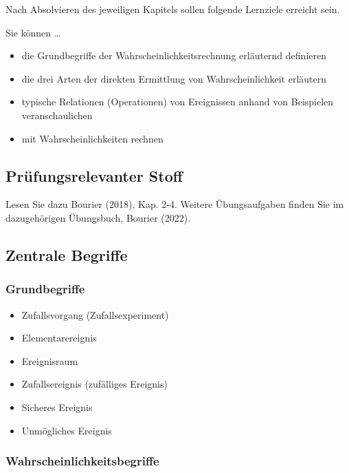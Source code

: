\documentclass[
  a4paper,
  DIV=11]{scrreprt}
\providecommand{\tightlist}{%
  \setlength{\itemsep}{0pt}\setlength{\parskip}{0pt}}\usepackage{longtable,booktabs,array}
\theoremstyle{definition}
\theoremstyle{remark}
\begin{document}
Nach Absolvieren des jeweiligen Kapitels sollen folgende Lernziele
erreicht sein.

Sie können \ldots{}

\begin{itemize}
\tightlist
\item
  die Grundbegriffe der Wahrscheinlichkeitsrechnung erläuternd
  definieren
\item
  die drei Arten der direkten Ermittlung von Wahrscheinlichkeit
  erläutern
\item
  typische Relationen (Operationen) von Ereignissen anhand von
  Beispielen veranschaulichen
\item
  mit Wahrscheinlichkeiten rechnen
\end{itemize}

\hypertarget{pruxfcfungsrelevanter-stoff}{%
\subsection{Prüfungsrelevanter
Stoff}\label{pruxfcfungsrelevanter-stoff}}

Lesen Sie dazu Bourier (2018), Kap. 2-4. Weitere Übungsaufgaben finden
Sie im dazugehörigen Übungsbuch, Bourier (2022).

\hypertarget{zentrale-begriffe}{%
\subsection{Zentrale Begriffe}\label{zentrale-begriffe}}

\hypertarget{grundbegriffe}{%
\subsubsection{Grundbegriffe}\label{grundbegriffe}}

\begin{itemize}
\tightlist
\item
  Zufallsvorgang (Zufallsexperiment)
\item
  Elementarereignis
\item
  Ereignisraum
\item
  Zufallsereignis (zufälliges Ereignis)
\item
  Sicheres Ereignis
\item
  Unmögliches Ereignis
\end{itemize}

\hypertarget{wahrscheinlichkeitsbegriffe}{%
\subsubsection{Wahrscheinlichkeitsbegriffe}\label{wahrscheinlichkeitsbegriffe}}
\end{document}
